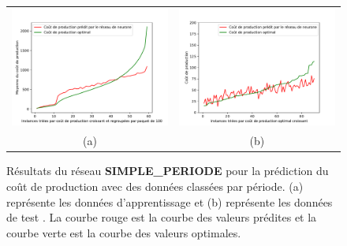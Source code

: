   
  
  \begin{figure}[H]
  	\centering
  	\begin{tabular}{c c}
  		\includegraphics[width=9cm]{images_these/SequentialModel_prediction_train_by_period.pdf}&
  		\includegraphics[width=9cm]{images_these/SequentialModel_prediction_test_by_period.pdf} 
  		\\
  		(a) & (b)
  	\end{tabular}
  	\caption[Résultats du réseau SIMPLE\_PERIODE]{Résultats du réseau \textbf{SIMPLE\_PERIODE} pour la prédiction du coût de production avec des données classées par période. (a) représente les données d'apprentissage et (b) représente les données de test . La courbe rouge est la courbe des valeurs prédites et la courbe verte est la courbe des valeurs optimales.}\label{6000_SequentialModel_prediction_by_period_1}
  \end{figure}
  
